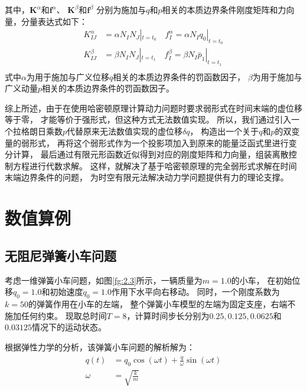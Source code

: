 其中，$\boldsymbol K^\alpha$和$\boldsymbol f^\alpha$、
$\boldsymbol K^\beta$和$\boldsymbol f^\beta$
分别为施加与$q$和$p$相关的本质边界条件刚度矩阵和力向量，分量表达式如下：
\begin{equation}
\begin{aligned}
K^\alpha_{IJ} &= \alpha N_I N_J |_{t=t_0} \quad
f^\alpha_I = \alpha N_I q_0 |_{t=t_0} \\
K^\beta_{IJ} &= \beta N_I N_J |_{t=t_1} \quad
f^\beta_I = \beta N_I \bar p_1 |_{t=t_1}  \\
\end{aligned}
\end{equation}
式中$\alpha$为用于施加与广义位移$q$相关的本质边界条件的罚函数因子，
$\beta$为用于施加与广义动量$p$相关的本质边界条件的罚函数因子。

综上所述，由于在使用哈密顿原理计算动力问题时要求弱形式在时间末端的虚位移等于零，
才能等价于强形式，但这种方式无法数值实现。
所以，我们通过引入一个拉格朗日乘数$p$代替原来无法数值实现的虚位移$\delta q$，
构造出一个关于$q$和$p$的双变量的弱形式，
再将这个弱形式作为一个投影项加入到原来的能量泛函式里进行变分计算，
最后通过有限元形函数近似得到对应的刚度矩阵和力向量，组装离散控制方程进行代数求解。
这样，就解决了基于哈密顿原理的完全弱形式求解在时间末端边界条件的问题，
为时空有限元法解决动力学问题提供有力的理论支撑。










\section{数值算例}
\subsection{无阻尼弹簧小车问题}\label{ch:wznthxc}

考虑一维弹簧小车问题，如图\ref{fg:2.3}所示，一辆质量为$m = 1.0$的小车，
在初始位移$q_0=1.0$和初始速度$\dot q_0=1.0$作用下水平向右移动。
同时，一个刚度系数为$k=50$的弹簧作用在小车的左端，
整个弹簧小车模型的左端为固定支座，右端不施加任何约束。
现取总时间$T=8$，计算时间步长分别为$0.25,0.125,0.0625$和$0.03125$情况下的运动状态。

根据弹性力学的分析，该弹簧小车问题的解析解为：
\begin{equation}\label{2.28}
\begin{split}
q(t) &= q_0 \cos (\omega t) + \frac{\dot q}{\omega} \sin(\omega t) \\
\omega &= \sqrt{\frac{k}{m}}
\end{split}
\end{equation}

